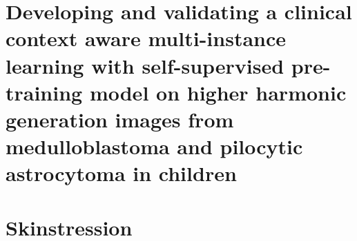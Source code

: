 \documentclass[
	fontsize=10pt, %
	twoside=false, %
	secnumdepth=2, %
	numbers=noenddot,
]{kaobook}
\begin{document}
\chapter[SCLICOM]{Developing and validating a clinical context aware multi-instance learning with self-supervised pre-training model on higher harmonic generation images from medulloblastoma and pilocytic astrocytoma in children}








\printbibheading[title=References, heading=bibintoc]
\printbibliography[heading=none] %

\appendix %


\chapter{Skinstression}





\backmatter %

\end{document}
